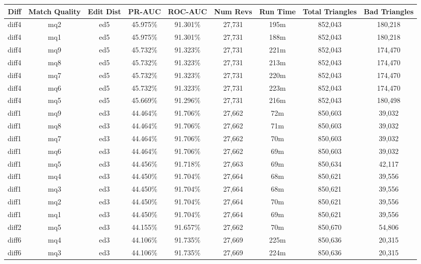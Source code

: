 \begin{sidewaystable}[!ph]
  \begin{center}
    \begin{tabular}{|c|c|c||c|c||c|c|c|c|}
\hline
Diff & Match Quality & Edit Dist
        & PR-AUC & ROC-AUC
        & Num Revs & Run Time
        & Total Triangles & Bad Triangles \\
\hline
\hline
diff4 & mq2 & ed5 & 45.975\% & 91.301\% & 27,731 & 195m & 852,043 & 180,218 \\
diff4 & mq1 & ed5 & 45.975\% & 91.301\% & 27,731 & 188m & 852,043 & 180,218 \\
diff4 & mq9 & ed5 & 45.732\% & 91.323\% & 27,731 & 221m & 852,043 & 174,470 \\
diff4 & mq8 & ed5 & 45.732\% & 91.323\% & 27,731 & 213m & 852,043 & 174,470 \\
diff4 & mq7 & ed5 & 45.732\% & 91.323\% & 27,731 & 220m & 852,043 & 174,470 \\
diff4 & mq6 & ed5 & 45.732\% & 91.323\% & 27,731 & 223m & 852,043 & 174,470 \\
diff4 & mq5 & ed5 & 45.669\% & 91.296\% & 27,731 & 216m & 852,043 & 180,498 \\
diff1 & mq9 & ed3 & 44.464\% & 91.706\% & 27,662 & 72m & 850,603 & 39,032 \\
diff1 & mq8 & ed3 & 44.464\% & 91.706\% & 27,662 & 71m & 850,603 & 39,032 \\
diff1 & mq7 & ed3 & 44.464\% & 91.706\% & 27,662 & 70m & 850,603 & 39,032 \\
diff1 & mq6 & ed3 & 44.464\% & 91.706\% & 27,662 & 69m & 850,603 & 39,032 \\
diff1 & mq5 & ed3 & 44.456\% & 91.718\% & 27,663 & 69m & 850,634 & 42,117 \\
diff1 & mq4 & ed3 & 44.450\% & 91.704\% & 27,664 & 68m & 850,621 & 39,556 \\
diff1 & mq3 & ed3 & 44.450\% & 91.704\% & 27,664 & 68m & 850,621 & 39,556 \\
diff1 & mq2 & ed3 & 44.450\% & 91.704\% & 27,664 & 70m & 850,621 & 39,556 \\
diff1 & mq1 & ed3 & 44.450\% & 91.704\% & 27,664 & 69m & 850,621 & 39,556 \\
diff2 & mq5 & ed3 & 44.155\% & 91.657\% & 27,662 & 70m & 850,670 & 54,806 \\
diff6 & mq4 & ed3 & 44.106\% & 91.735\% & 27,669 & 225m & 850,636 & 20,315 \\
diff6 & mq3 & ed3 & 44.106\% & 91.735\% & 27,669 & 224m & 850,636 & 20,315 \\

\end{tabular}
\end{center}
\end{sidewaystable}
